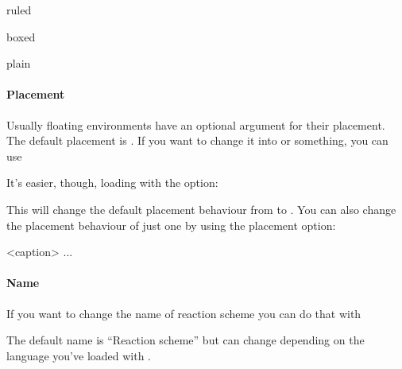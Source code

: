 \documentclass[toc=index,DIV10]{cnpkgdoc}
\begin{document}
\begin{beispiel}
 \begin{rxnscheme}{ruled}
 \end{rxnscheme}
 \begin{rxnscheme}{boxed}
 \end{rxnscheme}
 \begin{rxnscheme}{plain}
 \end{rxnscheme}
\end{beispiel}

\paragraph{Placement}
Usually floating environments have an optional argument for their placement.
The default placement is . If you want to change it into  or
something, you can use
\begin{beschreibung}
\end{beschreibung}

It's easier, though, loading \mychemistry with the  option:
\begin{beispiel}
 \usepackage[placement=<placement>]{mychemistry}
\end{beispiel}

This will change the default placement behaviour from  to .
You can also change the placement behaviour of just one  by
using the placement option:
\begin{beispiel}
 \begin{rxnscheme}[,<placement>]{<caption>}
  ...
 \end{rxnscheme}
\end{beispiel}

\paragraph{Name}\label{par:rxnscheme_name}
If you want to change the name of reaction scheme you can do that with
\begin{beschreibung}
\end{beschreibung}
The default name is ``Reaction scheme'' but can change depending on the language
you've loaded with .
\end{document}
